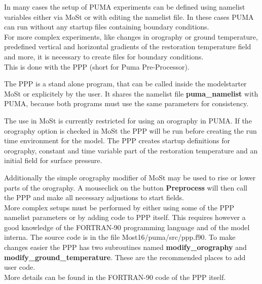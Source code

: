 In many cases the setup of PUMA experiments can be defined
using namelist variables either via MoSt or with editing
the namelist file. In these cases PUMA can run without
any startup files containing boundary conditions. \\

For more complex experiments, like changes in orography
or ground temperature, predefined vertical and horizontal
gradients of the restoration temperature field
and more, it is necessary to create files for boundary
conditions. \\

This is done with the PPP (short for Puma Pre-Processor).

The PPP is a stand alone program, that can be called
inside the modelstarter MoSt or explicitely by the user.
It shares the namelist file {\bf puma\_namelist} with
PUMA, because both programs must use the same parameters
for consistency.

The use in MoSt is currently restricted for using an orography
in PUMA. If the orography option is checked in MoSt the 
PPP will be run before creating the run time environment for
the model. The PPP creates startup definitions for 
orography, constant and time variable part of the restoration
temperature and an initial field for surface pressure.

Additionally the simple orography modifier of MoSt may be used
to rise or lower parts of the orography. A mouseclick on the
button {\bf Preprocess} will then call the PPP and make
all necessary adjustions to start fields. \\
More complex setups must be performed by either using some of
the PPP namelist parameters or by adding code to PPP itself.
This requires however a good knowledge of the FORTRAN-90
programming language and of the model interna.
The source code is in the file Most16/puma/src/ppp.f90.
To make changes easier the PPP has two subroutines
named {\bf modify\_orography} and {\bf modify\_ground\_temperature}.
These are the recommended places to add user code. \\

More details can be found in the FORTRAN-90 code of the PPP itself.

